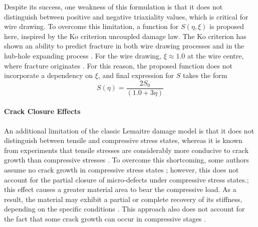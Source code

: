 \documentclass[sn-mathphys,Numbered,draft]{sn-jnl}%
\begin{document}
Despite its success, one weakness of this formulation is that it does not distinguish between positive and negative triaxiality values, which is critical for wire drawing.
To overcome this limitation, a function for $S(\eta,\xi)$ is proposed here, inspired by the Ko criterion \cite{ko_prediction_2007} uncoupled damage law.
The Ko criterion has shown an ability to predict fracture in both wire drawing processes \cite{roh_process_2021} and in the hub-hole expanding process \cite{ko_prediction_2007}.
For the wire drawing, $\xi\approx1.0$ at the wire centre, where fracture originates \cite{roh_process_2021}.
For this reason, the proposed function does not incorporate a dependency on $\xi$, and final expression for $S$ takes the form
\begin{equation} \label{eqn:proposedLemaitre}
	S(\eta) = \frac{2S_0}{\left(1.0+3\eta\right)}
\end{equation}




\paragraph{Crack Closure Effects}

An additional limitation of the classic Lemaitre damage model is that it does not distinguish between tensile and compressive stress states, whereas it is known from experiments that tensile stresses are considerably more conducive to crack growth than compressive stresses \cite{bao_cut-off_2005}.
To overcome this shortcoming, some authors assume no crack growth in compressive stress states \cite{chu_void_1980}; however, this does not account for the partial closure of micro-defects under compressive stress states.; this effect causes a greater material area to bear the compressive load.
As a result, the material may exhibit a partial or complete recovery of its stiffness, depending on the specific conditions \cite{teixeira_ductile_2010}.
This approach also does not account for the fact that some crack growth can occur in compressive stages \cite{basic_finite_2005}.
\end{document}
